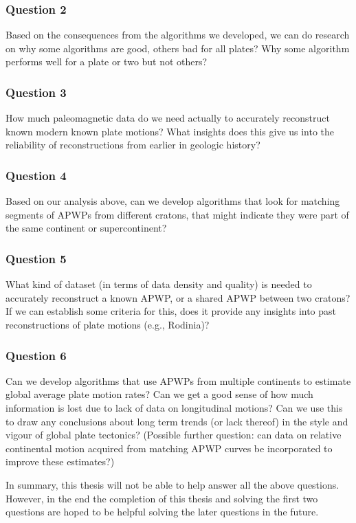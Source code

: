 \subsubsection{Question 2}

Based on the consequences from the algorithms we developed, we can do research
on why some algorithms are good, others bad for all plates? Why some algorithm
performs well for a plate or two but not others?

\subsubsection{Question 3}

How much paleomagnetic data do we need actually to accurately reconstruct known
modern known plate motions? What insights does this give us into the reliability
of reconstructions from earlier in geologic history?

\subsubsection{Question 4}

Based on our analysis above, can we develop algorithms that look for matching
segments of APWPs from different cratons, that might indicate they were part of
the same continent or supercontinent?

\subsubsection{Question 5}

What kind of dataset (in terms of data density and quality) is needed to
accurately reconstruct a known APWP, or a shared APWP between two cratons? If
we can establish some criteria for this, does it provide any insights into past
reconstructions of plate motions (e.g., Rodinia)?

\subsubsection{Question 6}

Can we develop algorithms that use APWPs from multiple continents to estimate
global average plate motion rates? Can we get a good sense of how much
information is lost due to lack of data on longitudinal motions? Can we use
this to draw any conclusions about long term trends (or lack thereof) in the
style and vigour of global plate tectonics? (Possible further question: can
data on relative continental motion acquired from matching APWP curves be
incorporated to improve these estimates?)

\bigskip
In summary, this thesis will not be able to help answer all the above questions.
However, in the end the completion of this thesis and solving the first two
questions are hoped to be helpful solving the later questions in the future.
